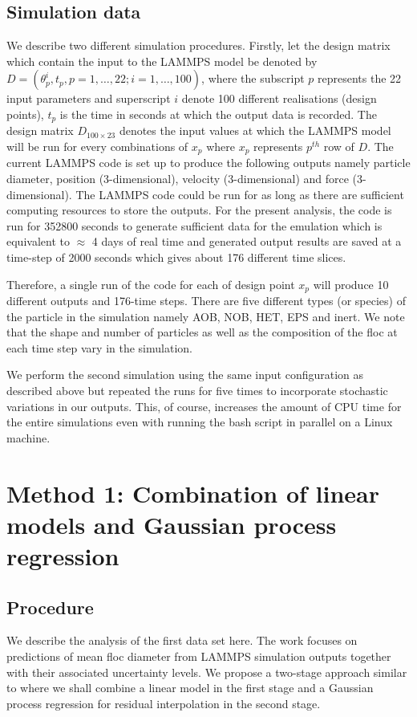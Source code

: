 \documentclass[12pt,titlepage]{report}
\theoremstyle{definition}
\theoremstyle{remark}
\begin{document}
\subsection{Simulation data}
We describe two different simulation procedures. Firstly, let the design matrix which contain the input to the LAMMPS model be denoted by $D=(\theta^i_p, t_p, p=1,\ldots,22; i=1,\ldots,100)$, where the subscript $p$ represents the 22 input parameters and superscript $i$ denote 100 different realisations (design points), $t_p$ is the time in seconds at which the output data is recorded. The design matrix $D_{100 \times 23}$ denotes the input values at which the LAMMPS model will be run for every combinations of $x_p$ where $x_p$ represents $p^{th}$ row of $D$. The current LAMMPS code is set up to produce the following outputs namely particle diameter, position (3-dimensional), velocity (3-dimensional) and force (3-dimensional). The LAMMPS code could be run for as long as there are sufficient computing resources to store the outputs. For the present analysis, the code is run for 352800 seconds to generate sufficient data for the emulation which is equivalent to $\approx$ 4 days of real time and generated output results are saved at a time-step of 2000 seconds which gives about 176 different time slices. 

Therefore, a single run of the code for each of design point $x_p$ will produce 10 different outputs and 176-time steps. There are five different types (or species) of the particle in the simulation namely AOB, NOB, HET, EPS and inert. We note that the shape and number of particles as well as the composition of the floc at each time step vary in the simulation. 

We perform the second simulation using the same input configuration as described above but repeated the runs for five times to incorporate stochastic variations in our outputs. This, of course, increases the amount of CPU time for the entire simulations even with running the bash script in parallel on a Linux machine. 


\section{Method 1: Combination of linear models and Gaussian process regression}
\subsection{Procedure}
We describe the analysis of the first data set here.
The work focuses on predictions of mean floc diameter from LAMMPS simulation outputs together with their associated uncertainty levels. We propose a two-stage approach similar to \citet{pd11} where we shall combine a linear model in the first stage and a Gaussian process regression for residual interpolation in the second stage.
\end{document}

